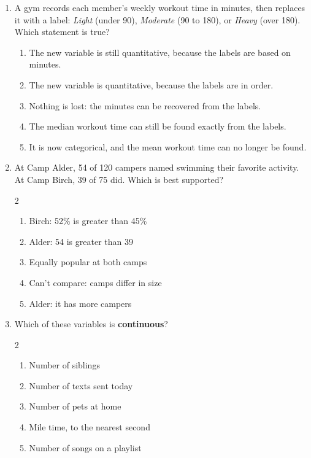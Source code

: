\documentclass[12pt]{article}
\newenvironment{choices}
  {\begin{enumerate}[label=\textbf{(\Alph*)}, leftmargin=2.2em, itemsep=0pt, topsep=1pt]}
  {\end{enumerate}}
\newcommand{\letterroom}{\rule[-15pt]{0pt}{36pt}}
\begin{document}
\begin{enumerate}[leftmargin=1.9em, itemsep=0.03in]

  \boxguard[10]
  \item A gym records each member's weekly workout time in minutes, then replaces it with a
        label: \emph{Light} (under 90), \emph{Moderate} (90 to 180), or \emph{Heavy} (over 180).
        Which statement is true?
        \begin{choices}
          \item The new variable is still quantitative, because the labels are based on minutes.
          \item The new variable is quantitative, because the labels are in order.
          \item Nothing is lost: the minutes can be recovered from the labels.
          \item The median workout time can still be found exactly from the labels.
          \item It is now categorical, and the mean workout time can no longer be found.
                \hfill{}\letterroom
        \end{choices}

  \boxguard[10]
  \item At Camp Alder, 54 of 120 campers named swimming their favorite activity. At Camp Birch,
        39 of 75 did. Which is best supported?\hfill{}\letterroom
        \begin{multicols}{2}
        \begin{choices}
          \item Birch: 52\% is greater than 45\%
          \item Alder: 54 is greater than 39
          \item Equally popular at both camps
          \item Can't compare: camps differ in size
          \item Alder: it has more campers
        \end{choices}
        \end{multicols}

  \boxguard[8]
  \item Which of these variables is \textbf{continuous}?\hfill{}\letterroom
        \begin{multicols}{2}
        \begin{choices}
          \item Number of siblings
          \item Number of texts sent today
          \item Number of pets at home
          \item Mile time, to the nearest second
          \item Number of songs on a playlist
        \end{choices}
        \end{multicols}


\end{enumerate}
\end{document}
